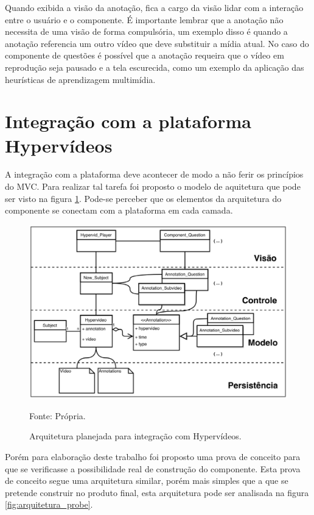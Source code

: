 Quando exibida a visão da anotação, fica a cargo da visão lidar com a interação entre o usuário e o componente. É importante lembrar que a anotação não necessita de uma visão de forma compulsória, um exemplo disso é quando a anotação referencia um outro vídeo que deve substituir a mídia atual. No caso do componente de questões é possível que a anotação requeira que o vídeo em reprodução seja pausado e a tela escurecida, como um exemplo da aplicação das heurísticas de aprendizagem multimídia.

\section{Integração com a plataforma Hypervídeos}

A integração com a plataforma deve acontecer de modo a não ferir os princípios do MVC. Para realizar tal tarefa foi proposto o modelo de aquitetura que pode ser visto na figura \ref{fig:arquitetura_final}. Pode-se perceber que os elementos da arquitetura do componente se conectam com a plataforma em cada camada. 

\begin{figure}[h!]
	\centering
  	\includegraphics[width=.9\linewidth]{figuras/arquitetura.eps}
  	\caption{Arquitetura planejada para integração com Hypervídeos.}
	\small{Fonte: Própria.}
  	\label{fig:arquitetura_final}
\end{figure}

Porém para elaboração deste trabalho foi proposto uma prova de conceito para que se verificasse a possibilidade real de construção do componente. Esta prova de conceito segue uma arquitetura similar, porém mais simples que a que se pretende construir no produto final, esta arquitetura pode ser analisada na figura \ref{fig:arquitetura_probe}. 

